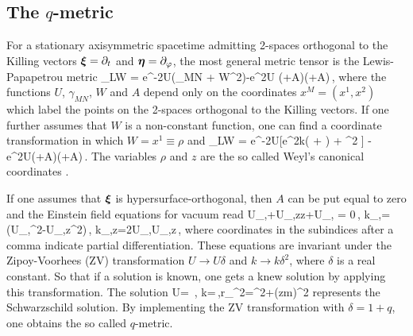 \documentclass[12pt]{article}
\begin{document}

\subsection{The $q$-metric}
For a stationary axisymmetric spacetime admitting 2-spaces orthogonal to the Killing vectors $\boldsymbol{\xi}=\partial_t$ and $\boldsymbol{\eta}=\partial_\varphi$, the most general metric tensor is the Lewis-Papapetrou \cite{lewis1932some,papapetrou1966champs} metric \cite{stephani2003}
\be
 	 _{\rm LW} = e^{-2U}(\gamma_{MN} + W^2\tprod{\varphi}{\varphi})-e^{2U} (+A\dd\varphi)\otimes (+A\dd\varphi)\,,
\ee
where the functions $U$, $\gamma_{MN}$, $W$ and $A$ depend only on the coordinates $x^M=(x^1,x^2)$ which label the points on the 2-spaces orthogonal to the Killing vectors. If one further assumes that $W$ is a non-constant function, one can find a coordinate transformation in which $W=x^1\equiv \rho$ and
\be
	_{\rm LW} = e^{-2U}[e^{2k}(\tprod{\rho}{\rho} + ) + \rho^2 \tprod{\varphi}{\varphi}] - e^{2U}(+A\dd\varphi)\otimes (+A\dd\varphi)\,.
\ee
The variables $\rho$ and $z$ are the so called Weyl's canonical coordinates \cite{stephani2003}.

If one assumes that $\boldsymbol{\xi}$ is hypersurface-orthogonal, then $A$ can be put equal to zero and the Einstein field equations for vacuum read
\be
	 U\!_{,\rho\rho}+U\!_{,zz}+U\!_{,\rho} = 0\,, \quad k_{,\rho}=\rho(U_{,\rho}^2-U_{,z}^2)\,, \quad k_{,z}=2\rho U\!_{,\rho}U\!_{,z}\,,
\ee
where coordinates in the subindices after a comma indicate partial differentiation. These equations are invariant under the Zipoy-Voorhees (ZV) transformation \cite{quevedo2011mass} $U\to U\delta$ and $k\to k\delta^2$, where $\delta$ is a real constant. So that if a solution is known, one gets a knew solution by applying this transformation. The solution 
\be
	U= \ln{}\,, \quad k=\ln{}\,,\quad r_{\pm}^2=\rho^2+(z\pm m)^2
\ee
represents the Schwarzschild solution. By implementing the ZV transformation with $\delta=1+q$, one obtains the so called $q$-metric.
\end{document}
